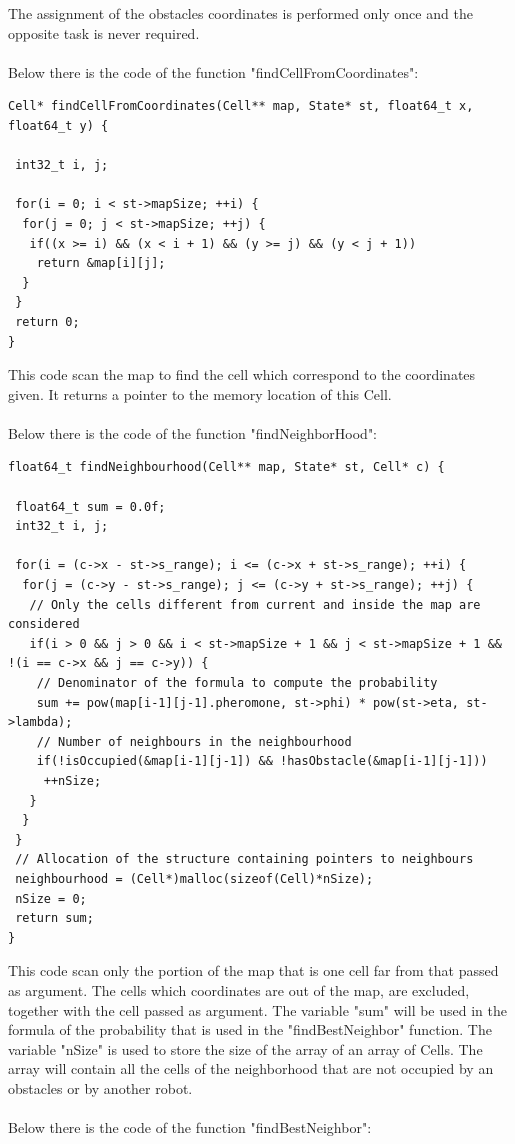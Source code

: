 \documentclass[english]{article}
\begin{document}
\noindent The assignment of the obstacles coordinates is performed only once and the opposite task is never required.\\
\\Below there is the code of the function "findCellFromCoordinates":

\begin{lstlisting}
Cell* findCellFromCoordinates(Cell** map, State* st, float64_t x, float64_t y) {

 int32_t i, j;

 for(i = 0; i < st->mapSize; ++i) {
  for(j = 0; j < st->mapSize; ++j) {
   if((x >= i) && (x < i + 1) && (y >= j) && (y < j + 1))
    return &map[i][j];
  }
 }
 return 0;
}
\end{lstlisting}

\noindent This code scan the map to find the cell which correspond to the coordinates given. It returns a pointer to the memory location of this Cell.\\
\\ Below there is the code of the function "findNeighborHood":

\begin{lstlisting}
float64_t findNeighbourhood(Cell** map, State* st, Cell* c) {

 float64_t sum = 0.0f;
 int32_t i, j;

 for(i = (c->x - st->s_range); i <= (c->x + st->s_range); ++i) {
  for(j = (c->y - st->s_range); j <= (c->y + st->s_range); ++j) {
   // Only the cells different from current and inside the map are considered
   if(i > 0 && j > 0 && i < st->mapSize + 1 && j < st->mapSize + 1 && !(i == c->x && j == c->y)) {
    // Denominator of the formula to compute the probability
    sum += pow(map[i-1][j-1].pheromone, st->phi) * pow(st->eta, st->lambda);
    // Number of neighbours in the neighbourhood
    if(!isOccupied(&map[i-1][j-1]) && !hasObstacle(&map[i-1][j-1]))
     ++nSize;
   }
  }
 }
 // Allocation of the structure containing pointers to neighbours
 neighbourhood = (Cell*)malloc(sizeof(Cell)*nSize);
 nSize = 0;
 return sum;
}
\end{lstlisting}

\noindent This code scan only the portion of the map that is one cell far from that passed as argument. The cells which coordinates are out of the map, are excluded, together with the cell passed as argument. The variable "sum" will be used in the formula of the probability that is used in the "findBestNeighbor" function. The variable "nSize" is used to store the size of the array of an array of Cells. The array will contain all the cells of the neighborhood that are not occupied by an obstacles or by another robot.\\
\\Below there is the code of the function "findBestNeighbor":
\end{document}
